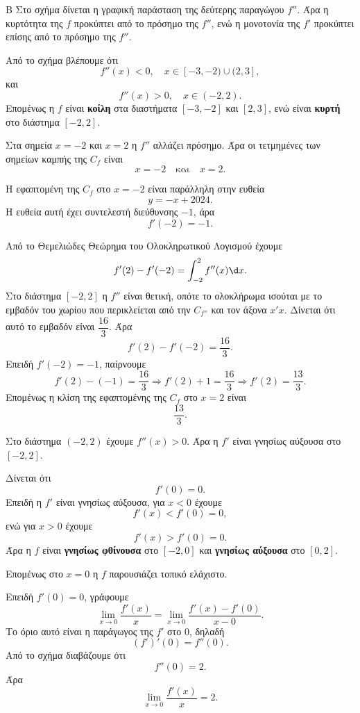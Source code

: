 \begin{thema}{Β}
Στο σχήμα δίνεται η γραφική παράσταση της δεύτερης παραγώγου $f''$. Άρα η κυρτότητα της $f$ προκύπτει από το πρόσημο της $f''$, ενώ η μονοτονία της $f'$ προκύπτει επίσης από το πρόσημο της $f''$.

\begin{erwthma}
\item Από το σχήμα βλέπουμε ότι
\[
f''(x)<0,\quad x\in[-3,-2)\cup(2,3],
\]
και
\[
f''(x)>0,\quad x\in(-2,2).
\]
Επομένως η $f$ είναι \textbf{κοίλη} στα διαστήματα $[-3,-2]$ και $[2,3]$, ενώ είναι \textbf{κυρτή} στο διάστημα $[-2,2]$.

Στα σημεία $x=-2$ και $x=2$ η $f''$ αλλάζει πρόσημο. Άρα οι τετμημένες των σημείων καμπής της $C_f$ είναι
\[
x=-2
\quad\text{και}\quad
x=2.
\]

\item Η εφαπτομένη της $C_f$ στο $x=-2$ είναι παράλληλη στην ευθεία
\[
y=-x+2024.
\]
Η ευθεία αυτή έχει συντελεστή διεύθυνσης $-1$, άρα
\[
f'(-2)=-1.
\]

Από το Θεμελιώδες Θεώρημα του Ολοκληρωτικού Λογισμού έχουμε
\[
f'(2)-f'(-2)=\dint_{-2}^{2} f''(x)\d x.
\]
Στο διάστημα $[-2,2]$ η $f''$ είναι θετική, οπότε το ολοκλήρωμα ισούται με το εμβαδόν του χωρίου που περικλείεται από την $C_{f''}$ και τον άξονα $x'x$. Δίνεται ότι αυτό το εμβαδόν είναι $\dfrac{16}{3}$. Άρα
\[
f'(2)-f'(-2)=\frac{16}{3}.
\]
Επειδή $f'(-2)=-1$, παίρνουμε
\[
f'(2)-(-1)=\frac{16}{3}
\Rightarrow
f'(2)+1=\frac{16}{3}
\Rightarrow
f'(2)=\frac{13}{3}.
\]
Επομένως η κλίση της εφαπτομένης της $C_f$ στο $x=2$ είναι
\[
\frac{13}{3}.
\]

\item Στο διάστημα $(-2,2)$ έχουμε $f''(x)>0$. Άρα η $f'$ είναι γνησίως αύξουσα στο $[-2,2]$.

Δίνεται ότι
\[
f'(0)=0.
\]
Επειδή η $f'$ είναι γνησίως αύξουσα, για $x<0$ έχουμε
\[
f'(x)<f'(0)=0,
\]
ενώ για $x>0$ έχουμε
\[
f'(x)>f'(0)=0.
\]
Άρα η $f$ είναι \textbf{γνησίως φθίνουσα} στο $[-2,0]$ και \textbf{γνησίως αύξουσα} στο $[0,2]$.

Επομένως στο $x=0$ η $f$ παρουσιάζει τοπικό ελάχιστο.

\item Επειδή $f'(0)=0$, γράφουμε
\[
\lim_{x\to 0}\frac{f'(x)}{x}
=\lim_{x\to 0}\frac{f'(x)-f'(0)}{x-0}.
\]
Το όριο αυτό είναι η παράγωγος της $f'$ στο $0$, δηλαδή
\[
(f')'(0)=f''(0).
\]
Από το σχήμα διαβάζουμε ότι
\[
f''(0)=2.
\]
Άρα
\[
\lim_{x\to 0}\frac{f'(x)}{x}=2.
\]
\end{erwthma}
\end{thema}


